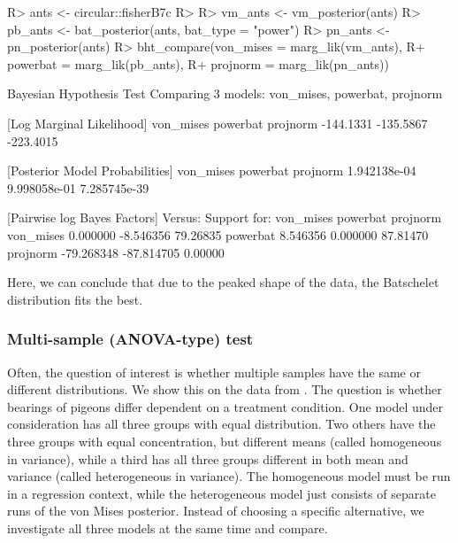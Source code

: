 \begin{CodeChunk}

\begin{CodeInput}
R> ants <- circular::fisherB7c
R> 
R> vm_ants <- vm_posterior(ants)
R> pb_ants <- bat_posterior(ants, bat_type = "power")
R> pn_ants <- pn_posterior(ants)
R> bht_compare(von_mises = marg_lik(vm_ants), 
R+             powerbat  = marg_lik(pb_ants), 
R+             projnorm  = marg_lik(pn_ants))
\end{CodeInput}

\begin{CodeOutput}
Bayesian Hypothesis Test
    Comparing 3 models: von_mises, powerbat, projnorm

[Log Marginal Likelihood]
von_mises  powerbat  projnorm 
-144.1331 -135.5867 -223.4015 

[Posterior Model Probabilities]
   von_mises     powerbat     projnorm 
1.942138e-04 9.998058e-01 7.285745e-39 

[Pairwise log Bayes Factors]
               Versus: 
Support for:     von_mises   powerbat projnorm
      von_mises   0.000000  -8.546356 79.26835
      powerbat    8.546356   0.000000 87.81470
      projnorm  -79.268348 -87.814705  0.00000
\end{CodeOutput}
\end{CodeChunk}

Here, we can conclude that due to the peaked shape of the data, the
Batschelet distribution fits the best.

\hypertarget{multi-sample-anova-type-test}{%
\subsubsection{Multi-sample (ANOVA-type)
test}\label{multi-sample-anova-type-test}}

Often, the question of interest is whether multiple samples have the
same or different distributions. We show this on the  data
\citep{gagliardo2008navigational, fisher1995statistical} from
. The question is whether bearings of pigeons differ
dependent on a treatment condition. One model under consideration has
all three groups with equal distribution. Two others have the three
groups with equal concentration, but different means (called homogeneous
in variance), while a third has all three groups different in both mean
and variance (called heterogeneous in variance). The homogeneous model
must be run in a regression context, while the heterogeneous model just
consists of separate runs of the von Mises posterior. Instead of
choosing a specific alternative, we investigate all three models at the
same time and compare.


